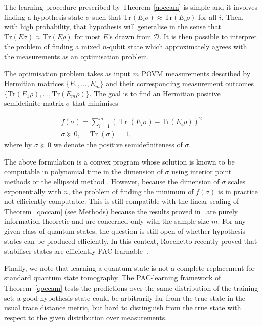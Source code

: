 \documentclass[aps,superscriptaddress,nofootinbib,twocolumn]{revtex4-1}
\begin{document}
The learning procedure prescribed by Theorem~\ref{qoccam} is simple and it involves finding a hypothesis state $\sigma$ such that $\mathrm{Tr} (E_i \sigma) \approx \mathrm{Tr} (E_i \rho) $ for all $i$. Then, with high probability, that hypothesis will generalise in the sense that $\mathrm{Tr} (E \sigma) \approx \mathrm{Tr} (E \rho) $  for most $E$'s drawn from $\mathcal{D}$. It is then possible to interpret the problem of finding a mixed $n$-qubit state which approximately agrees with the measurements as an optimisation problem. 

The optimisation problem takes as input $m$ POVM measurements described by Hermitian matrices $\{ E_1 , \dots, E_m \}$ and their corresponding measurement outcomes $\{ \mathrm{Tr} (E_1 \rho), \dots , \mathrm{Tr} (E_m \rho) \}$. The goal is to find an Hermitian positive semidefinite matrix $\sigma$ that minimises

\begin{gather}\label{eq:optcond2}
f(\sigma) = \sum_{i=1} ^m ( \operatorname*{Tr}(E_i  \sigma) - \mathrm{Tr} (E_i \rho) )^2    \\
\sigma \succeq 0,  \quad   \operatorname*{Tr}(\sigma) = 1,   \nonumber  
\end{gather}
where by $\sigma \succeq 0$ we denote the positive semidefiniteness of $\sigma$.

The above formulation is a convex program whose solution is known to be computable in polynomial time in the dimension of $\sigma$ using interior point methods \cite{nesterov1994interiori, alizadeh1995interior} or the ellipsoid method \cite{grotschel2012geometric}. However, because the dimension of $\sigma$ scales exponentially with $n$,  the problem of finding the minimum of $f(\sigma)$ is in practice not efficiently computable. This is still compatible with the linear scaling of Theorem~\ref{qoccam} (see Methods) because the results proved in~\cite{aaronson2007learnability} are purely information-theoretic and are concerned only with the sample size $m$. For any given class of quantum states, the question is still open of whether hypothesis states can be produced efficiently. In this context, Rocchetto recently proved that stabiliser states are efficiently PAC-learnable~\cite{rocchetto2017stabiliser}.

Finally, we note that learning a quantum state is not a complete replacement for standard quantum state tomography. The PAC-learning framework of Theorem~\ref{qoccam} tests the predictions over the same distribution of the training set; a good hypothesis state could be arbitrarily far from the true state in the usual trace distance metric, but hard to distinguish from the true state with respect to the given distribution over measurements.
\end{document}
